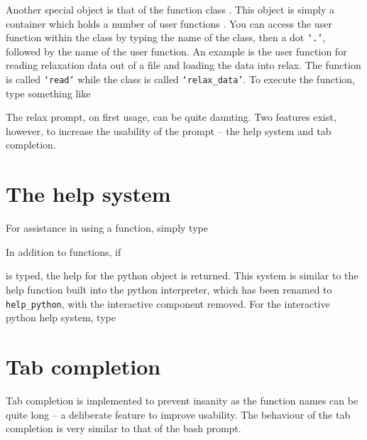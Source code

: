 
Another special object is that of the function class .  This object is simply a container which holds a number of user functions .  You can access the user function within the class by typing the name of the class, then a dot \texttt{`.'}, followed by the name of the user function.  An example is the user function for reading relaxation data out of a file and loading the data into relax.  The function is called \texttt{`read'} while the class is called \texttt{`relax\_data'}.  To execute the function, type something like


The relax prompt, on first usage, can be quite daunting.  Two features exist, however, to increase the usability of the prompt -- the help system and tab completion.




\section{The help system}

For assistance in using a function, simply type


In addition to functions, if


is typed, the help for the python object is returned.  This system is similar to the help function built into the python interpreter, which has been renamed to \texttt{help\_python}, with the interactive component removed.  For the interactive python help system, type






\section{Tab completion}

Tab completion is implemented to prevent insanity as the function names can be quite long -- a deliberate feature to improve usability.  The behaviour of the tab completion is very similar to that of the bash prompt.

